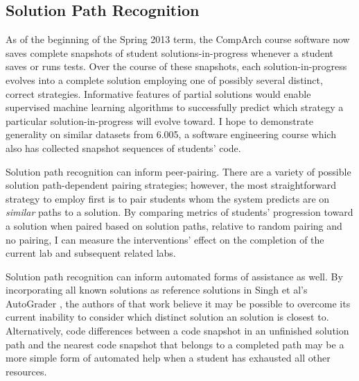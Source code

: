 \documentclass[12pt]{article}
\begin{document}
\subsection{Solution Path Recognition}


As of the beginning of the Spring 2013 term, the CompArch course software now saves complete snapshots of student solutions-in-progress whenever a student saves or runs tests. Over the course of these snapshots, each solution-in-progress evolves into a complete solution employing one of possibly several distinct, correct strategies. Informative features of partial solutions would enable supervised machine learning algorithms to successfully predict which strategy a particular solution-in-progress will evolve toward. I hope to demonstrate generality on similar datasets from 6.005, a software engineering course which also has collected snapshot sequences of students' code.


Solution path recognition can inform peer-pairing. There are a variety of possible solution path-dependent pairing strategies; however, the most straightforward strategy to employ first is to pair students whom the system predicts are on {\em similar} paths to a solution. By comparing metrics of students' progression toward a solution when paired based on solution paths, relative to random pairing and no pairing, I can measure the interventions' effect on the completion of the current lab and subsequent related labs.

Solution path recognition can inform automated forms of assistance as well. By incorporating all known solutions as reference solutions in Singh et al's AutoGrader \cite{rishabh}, the authors of that work believe it may be possible to overcome its current inability to consider which distinct solution an solution is closest to. Alternatively, code differences between a code snapshot in an unfinished solution path and the nearest code snapshot that belongs to a completed path may be a more simple form of automated help when a student has exhausted all other resources. %
\end{document}
